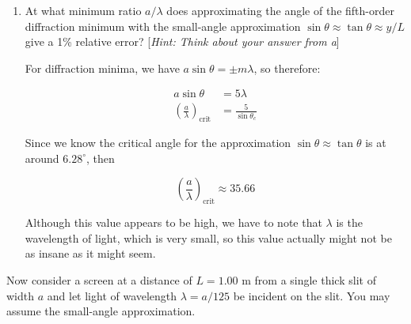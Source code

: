 \documentclass[10pt]{article}
\begin{document}
    \begin{enumerate}[resume, label=\alph*)]
        \item At what minimum ratio $a/\lambda$ does approximating the angle of the fifth-order diffraction minimum with the small-angle approximation $\sin \theta \approx \tan \theta \approx y/L$ give a 1\% relative error? [\textit{Hint: Think about your answer from a}]
            
    \begin{solution}
            For diffraction minima, we have $a \sin \theta = \pm m\lambda$, so therefore: 

            \begin{align*}
                a \sin \theta & = 5 \lambda\\
                \left(\frac{a}{\lambda}\right)_{\text{crit}} &= \frac{5}{\sin \theta_c}
            \end{align*}

            Since we know the critical angle for the approximation $\sin \theta \approx \tan \theta$ is at around $6.28^\circ$, then 

            \[ \left(\frac{a}{\lambda}\right)_{\text{crit}} \approx 35.66\]

            Although this value appears to be high, we have to note that $\lambda$ is the wavelength of light, which is very small, so this value actually might not be as insane as it might seem.
        \end{solution}
    \end{enumerate}


    Now consider a screen at a distance of $L = 1.00$ m from a single thick slit of width $a$ and let light of wavelength $\lambda = a/125$ be incident on the slit. You may assume the small-angle approximation. 
\end{document}
